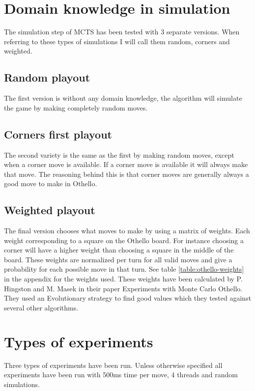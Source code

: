 \documentclass[
11pt, %
english, %
singlespacing, %
headsepline, %
]{MastersDoctoralThesis} %
\begin{document}
\section{Domain knowledge in simulation}
The simulation step of MCTS has been tested with 3 separate versions. When referring to these types of simulations I will call them random, corners and weighted.

\subsection{Random playout}
The first version is without any domain knowledge, the algorithm will simulate the game by making completely random moves.

\subsection{Corners first playout}
The second variety is the same as the first by making random moves, except when a corner move is available. If a corner move is available it will always make that move. The reasoning behind this is that corner moves are generally always a good move to make in Othello.

\subsection{Weighted playout}
The final version chooses what moves to make by using a matrix of weights. Each weight corresponding to a square on the Othello board. For instance choosing a corner will have a higher weight than choosing a square in the middle of the board. These weights are normalized per turn for all valid moves and give a probability for each possible move in that turn. See table \ref{table:othello-weights} in the appendix for the weights used. These weights have been calculated by P. Hingston and M. Masek in their paper Experiments with Monte Carlo Othello\cite{hingston2007experiments}. They used an Evolutionary strategy to find good values which they tested against several other algorithms.

\section{Types of experiments}
\label{section:type-experiments}
Three types of experiments have been run. Unless otherwise specified all experiments have been run with 500ms time per move, 4 threads and random simulations.
\end{document}
